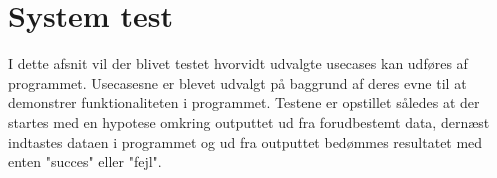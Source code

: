 
\section{System test}
I dette afsnit vil der blivet testet hvorvidt udvalgte usecases kan udføres af programmet. Usecasesne er blevet udvalgt på baggrund af deres evne til at demonstrer funktionaliteten i programmet. 
Testene er opstillet således at der startes med en hypotese omkring outputtet ud fra forudbestemt data, dernæst indtastes dataen i programmet og ud fra outputtet bedømmes resultatet med enten "succes" eller "fejl".




			
	   
